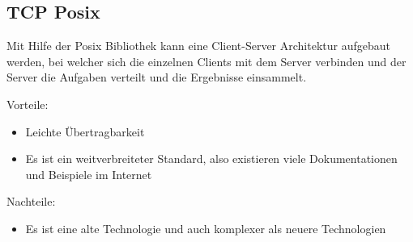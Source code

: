 \subsection{TCP Posix}
Mit Hilfe der Posix Bibliothek kann eine
Client-Server Architektur aufgebaut werden, bei welcher sich die einzelnen Clients mit dem Server
verbinden und der Server die Aufgaben verteilt und die Ergebnisse einsammelt.

Vorteile:
\begin{itemize}
    \item Leichte Übertragbarkeit
    \item Es ist ein weitverbreiteter Standard, also existieren viele Dokumentationen und
    Beispiele im Internet
\end{itemize}

Nachteile:
\begin{itemize}
    \item Es ist eine alte Technologie und auch komplexer als neuere Technologien
\end{itemize}